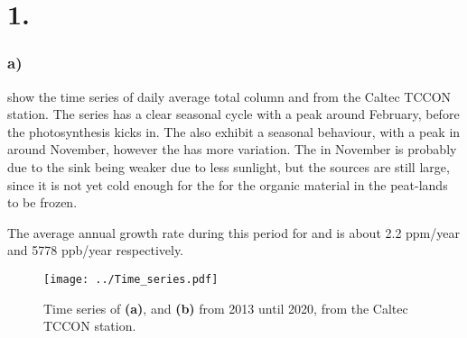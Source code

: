 \section*{1.}

\subsubsection*{a)}  show the time series of
daily average total column  and  from the Caltec TCCON station.
The  series has a 
clear seasonal cycle with a peak around February, before the photosynthesis
kicks in. The  also exhibit a
seasonal behaviour, with a peak in  around November, however the
 has more variation. The  in November is probably due to the
sink being weaker due to less sunlight, but the sources are still large, since
it is not yet cold enough for the for the organic material in the peat-lands to
be frozen. 

The average annual growth rate during this period for  and  is
about 2.2 ppm/year and 5778 ppb/year respectively.  
 
\begin{figure}[htbp]
    \texttt{[image: ../Time\_series.pdf]}
    \centering
    \caption{Time series of  \textbf{(a)}, and  \textbf{(b)} from 2013 until 2020, from the Caltec TCCON station.}
    \label{fig:Time_series_XCH4_XCO2}

\end{figure}

